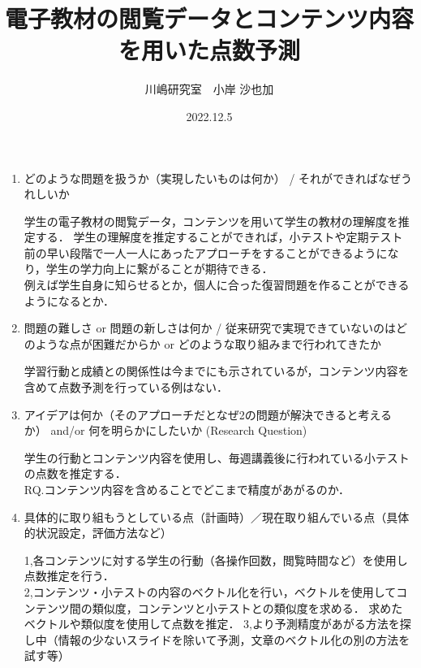 \documentclass[a4j]{jarticle}
\title{電子教材の閲覧データとコンテンツ内容を用いた点数予測}
\author{川嶋研究室　小岸 沙也加}
\date{2022.12.5}
\begin{document}
\maketitle

\begin{enumerate}
 \item どのような問題を扱うか（実現したいものは何か） / それができればなぜうれしいか

      \begin{boxedminipage}{\linewidth}
       学生の電子教材の閲覧データ，コンテンツを用いて学生の教材の理解度を推定する．
       学生の理解度を推定することができれば，小テストや定期テスト前の早い段階で一人一人にあったアプローチをすることができるようになり，学生の学力向上に繋がることが期待できる． \\
       例えば学生自身に知らせるとか，個人に合った復習問題を作ることができるようになるとか．
       \end{boxedminipage}
 
 \item 問題の難しさ or 問題の新しさは何か / 従来研究で実現できていないのはどのような点が困難だからか or どのような取り組みまで行われてきたか
 
      \begin{boxedminipage}{\linewidth}
       学習行動と成績との関係性は今までにも示されているが，コンテンツ内容を含めて点数予測を行っている例はない．
      \end{boxedminipage}

 \item アイデアは何か（そのアプローチだとなぜ2の問題が解決できると考えるか） and/or 何を明らかにしたいか (Research Question)
 
      \begin{boxedminipage}{\linewidth}
       学生の行動とコンテンツ内容を使用し、毎週講義後に行われている小テストの点数を推定する．\\
       RQ.コンテンツ内容を含めることでどこまで精度があがるのか．
       \end{boxedminipage}

 \item 具体的に取り組もうとしている点（計画時）／現在取り組んでいる点（具体的状況設定，評価方法など）
 
      \begin{boxedminipage}{\linewidth}
       1,各コンテンツに対する学生の行動（各操作回数，閲覧時間など）を使用し点数推定を行う．\\
       2,コンテンツ・小テストの内容のベクトル化を行い，ベクトルを使用してコンテンツ間の類似度，コンテンツと小テストとの類似度を求める．
       求めたベクトルや類似度を使用して点数を推定．
       3,より予測精度があがる方法を探し中（情報の少ないスライドを除いて予測，文章のベクトル化の別の方法を試す等）
       \end{boxedminipage}
 

\end{enumerate}
\end{document}
